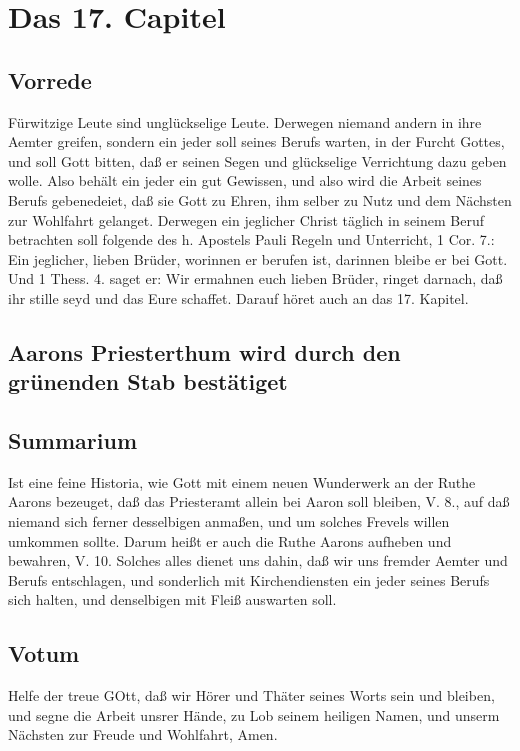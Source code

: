 \chapter{Das 17. Capitel}

\section{Vorrede}

Fürwitzige Leute sind unglückselige Leute. Derwegen niemand andern in ihre Aemter greifen, sondern ein jeder soll seines Berufs warten, in der Furcht Gottes, und soll Gott bitten, daß er seinen Segen und glückselige Verrichtung dazu geben wolle. Also behält ein jeder ein gut Gewissen, und also wird die Arbeit seines Berufs gebenedeiet, daß sie Gott zu Ehren, ihm selber zu Nutz und dem Nächsten zur Wohlfahrt gelanget. Derwegen ein jeglicher Christ täglich in seinem Beruf betrachten soll folgende des h. Apostels Pauli Regeln und Unterricht, 1 Cor. 7.: Ein jeglicher, lieben Brüder, worinnen er berufen ist, darinnen bleibe er bei Gott. Und 1 Thess. 4. saget er: Wir ermahnen euch lieben Brüder, ringet darnach, daß ihr stille seyd und das Eure schaffet. Darauf höret auch an das 17. Kapitel.

\section{Aarons Priesterthum wird durch den grünenden Stab bestätiget}

\section{Summarium}

Ist eine feine Historia, wie Gott mit einem neuen Wunderwerk an der Ruthe Aarons bezeuget, daß das Priesteramt allein bei Aaron soll bleiben, V. 8., auf daß niemand sich ferner desselbigen anmaßen, und um solches Frevels willen umkommen sollte. Darum heißt er auch die Ruthe Aarons aufheben und bewahren, V. 10. Solches alles dienet uns dahin, daß wir uns fremder Aemter und Berufs entschlagen, und sonderlich mit Kirchendiensten ein jeder seines Berufs sich halten, und denselbigen mit Fleiß auswarten soll.

\section{Votum}

Helfe der treue GOtt, daß wir Hörer und Thäter seines Worts sein und bleiben, und segne die Arbeit unsrer Hände, zu Lob seinem heiligen Namen, und unserm Nächsten zur Freude und Wohlfahrt, Amen.

